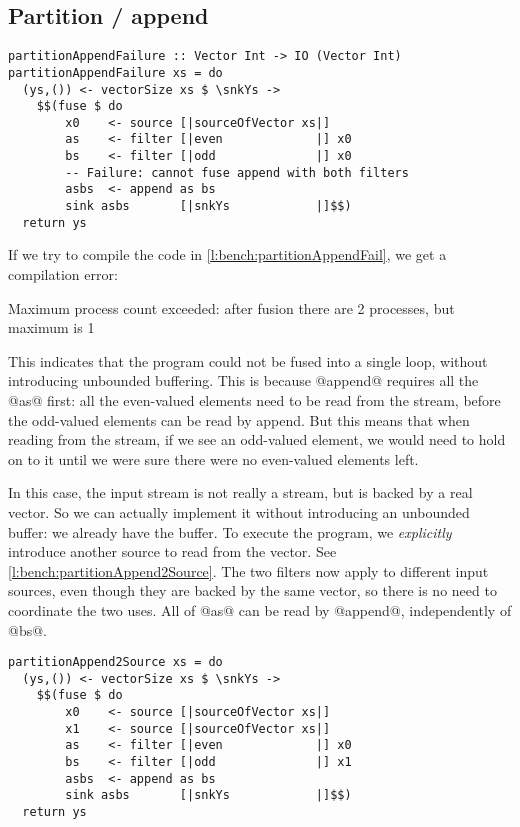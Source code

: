 \subsection{Partition / append}

\begin{lstlisting}[float,label=l:bench:partitionAppendFail,caption=Partition / append fusion failure]
partitionAppendFailure :: Vector Int -> IO (Vector Int)
partitionAppendFailure xs = do
  (ys,()) <- vectorSize xs $ \snkYs ->
    $$(fuse $ do
        x0    <- source [|sourceOfVector xs|]
        as    <- filter [|even             |] x0
        bs    <- filter [|odd              |] x0
        -- Failure: cannot fuse append with both filters
        asbs  <- append as bs
        sink asbs       [|snkYs            |]$$)
  return ys
\end{lstlisting}

If we try to compile the code in \autoref{l:bench:partitionAppendFail}, we get a compilation error:
\begin{code}
Maximum process count exceeded:
 after fusion there are 2 processes, but maximum is 1
\end{code}
This indicates that the program could not be fused into a single loop, without introducing unbounded buffering.
This is because @append@ requires all the @as@ first: all the even-valued elements need to be read from the stream, before the odd-valued elements can be read by append.
But this means that when reading from the stream, if we see an odd-valued element, we would need to hold on to it until we were sure there were no even-valued elements left.

In this case, the input stream is not really a stream, but is backed by a real vector.
So we can actually implement it without introducing an unbounded buffer: we already have the buffer.
To execute the program, we \emph{explicitly} introduce another source to read from the vector. 
See \autoref{l:bench:partitionAppend2Source}.
The two filters now apply to different input sources, even though they are backed by the same vector, so there is no need to coordinate the two uses.
All of @as@ can be read by @append@, independently of @bs@.

\begin{lstlisting}[float,label=l:bench:partitionAppend2Source,caption=Partition / append with two sources]
partitionAppend2Source xs = do
  (ys,()) <- vectorSize xs $ \snkYs ->
    $$(fuse $ do
        x0    <- source [|sourceOfVector xs|]
        x1    <- source [|sourceOfVector xs|]
        as    <- filter [|even             |] x0
        bs    <- filter [|odd              |] x1
        asbs  <- append as bs
        sink asbs       [|snkYs            |]$$)
  return ys
\end{lstlisting}

